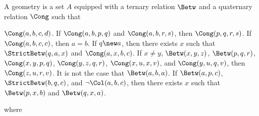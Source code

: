 %
%
\begin{theory}
   A geometry is a set $A$
   equipped with
   a ternary relation $\Betw$
   and a quaternary relation $\Cong$
   such that
   \begin{axioms}
         $\Cong(a,b,c,d)$.
         If $\Cong(a,b,p,q)$ and $\Cong(a,b,r,s)$,
         then $\Cong(p,q,r,s)$.
         If $\Cong(a,b,c,c)$, then $a = b$.
         If $q\new a$, then there exists $x$
         such that $\StrictBetw(q,a,x)$ and $\Cong(a,x,b,c)$.
         If $x\neq y$, $\Betw(x, y, z)$, $\Betw(p, q, r)$,
         $\Cong(x, y, p, q)$, $\Cong(y, z, q, r)$,
         $\Cong(x, u, x, v)$, and $\Cong(y, u, q, v)$,
         then $\Cong(z, u, r, v)$.
         It is not the case that $\Betw(a, b, a)$.
         If $\Betw(a, p, c)$, $\StrictBetw(b, q, c)$,
         and $\lnot\Col(a, b, c)$,
         then there exists $x$ such that
         $\Betw(p, x, b)$ and $\Betw(q, x, a)$.
   \end{axioms}
   where
\end{theory}
